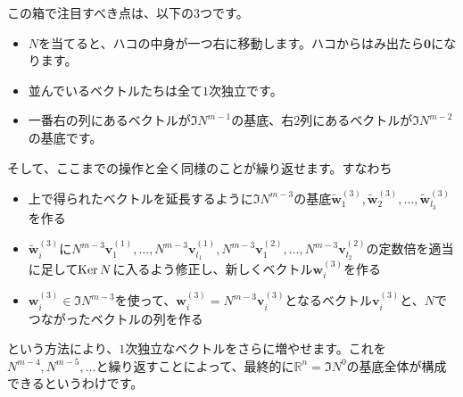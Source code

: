 この箱で注目すべき点は、以下の$3$つです。
\begin{itemize}
\item $N$を当てると、ハコの中身が一つ右に移動します。ハコからはみ出たら$\bm{0}$になります。
\item 並んでいるベクトルたちは全て$1$次独立です。
\item 一番右の列にあるベクトルが$\Im N^{m - 1}$の基底、右$2$列にあるベクトルが$\Im N^{m - 2}$の基底です。
\end{itemize}
そして、ここまでの操作と全く同様のことが繰り返せます。すなわち
\begin{itemize}
\item 上で得られたベクトルを延長するように$\Im N^{m - 3}$の基底$\tilde{\bm{w}}^{(3)}_1, \tilde{\bm{w}}^{(3)}_2, \ldots, \tilde{\bm{w}}^{(3)}_{l_3}$を作る
\item $\tilde{\bm{w}}^{(3)}_i$に$N^{m - 3}\bm{v}^{(1)}_1, \ldots, N^{m - 3}\bm{v}^{(1)}_{l_1}, N^{m - 3}\bm{v}^{(2)}_1, \ldots, N^{m - 3}\bm{v}^{(2)}_{l_2}$の定数倍を適当に足して$\operatorname{Ker} N$に入るよう修正し、新しくベクトル$\bm{w}^{(3)}_i$を作る
\item $\bm{w}^{(3)}_i \in \Im N^{m - 3}$を使って、$\bm{w}^{(3)}_i = N^{m - 3} \bm{v}^{(3)}_i$となるベクトル$\bm{v}^{(3)}_i$と、$N$でつながったベクトルの列を作る
\end{itemize}
という方法により、$1$次独立なベクトルをさらに増やせます。これを$N^{m - 4}, N^{m - 5}, \ldots$と繰り返すことによって、最終的に$\mathbb{R}^n = \Im N^0$の基底全体が構成できるというわけです。

